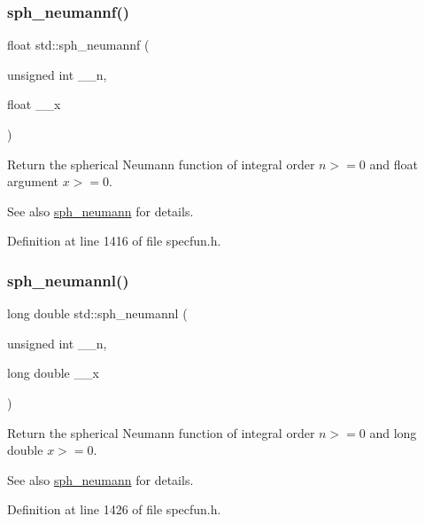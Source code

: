 \subsubsection{\texorpdfstring{sph\+\_\+neumannf()}{sph\_neumannf()}}
{\footnotesize\ttfamily float std\+::sph\+\_\+neumannf (\begin{DoxyParamCaption}\item[{unsigned int}]{\+\_\+\+\_\+n,  }\item[{float}]{\+\_\+\+\_\+x }\end{DoxyParamCaption})\hspace{0.3cm}{\ttfamily [inline]}}

Return the spherical Neumann function of integral order $ n >= 0 $ and {\ttfamily float} argument $ x >= 0 $.

\begin{DoxySeeAlso}{See also}
\hyperlink{group__mathsf__std_ga01cdd716aaca8ff3c08f307800fd5220}{sph\+\_\+neumann} for details. 
\end{DoxySeeAlso}


Definition at line 1416 of file specfun.\+h.

\mbox{\label{group__mathsf__std_ga3cededa9b6e4601f190c3811e6aabfd6}} 
\subsubsection{\texorpdfstring{sph\+\_\+neumannl()}{sph\_neumannl()}}
{\footnotesize\ttfamily long double std\+::sph\+\_\+neumannl (\begin{DoxyParamCaption}\item[{unsigned int}]{\+\_\+\+\_\+n,  }\item[{long double}]{\+\_\+\+\_\+x }\end{DoxyParamCaption})\hspace{0.3cm}{\ttfamily [inline]}}

Return the spherical Neumann function of integral order $ n >= 0 $ and {\ttfamily long double} $ x >= 0 $.

\begin{DoxySeeAlso}{See also}
\hyperlink{group__mathsf__std_ga01cdd716aaca8ff3c08f307800fd5220}{sph\+\_\+neumann} for details. 
\end{DoxySeeAlso}


Definition at line 1426 of file specfun.\+h.

